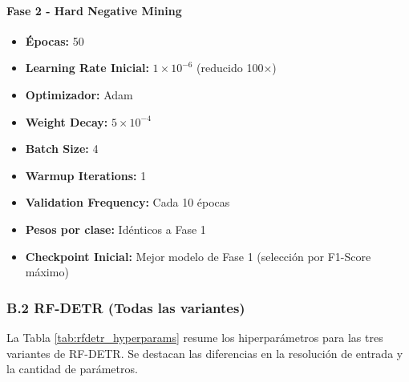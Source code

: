 \paragraph{Fase 2 - Hard Negative Mining}
\begin{itemize}
    \item \textbf{Épocas:} 50
    \item \textbf{Learning Rate Inicial:} $1 \times 10^{-6}$ (reducido 100×)
    \item \textbf{Optimizador:} Adam
    \item \textbf{Weight Decay:} $5 \times 10^{-4}$
    \item \textbf{Batch Size:} 4
    \item \textbf{Warmup Iterations:} 1
    \item \textbf{Validation Frequency:} Cada 10 épocas
    \item \textbf{Pesos por clase:} Idénticos a Fase 1
    \item \textbf{Checkpoint Inicial:} Mejor modelo de Fase 1 (selección por F1-Score máximo)
\end{itemize}

\subsubsection*{B.2 RF-DETR (Todas las variantes)}

La Tabla \ref{tab:rfdetr_hyperparams} resume los hiperparámetros para las tres variantes de RF-DETR. Se destacan las diferencias en la resolución de entrada y la cantidad de parámetros.


